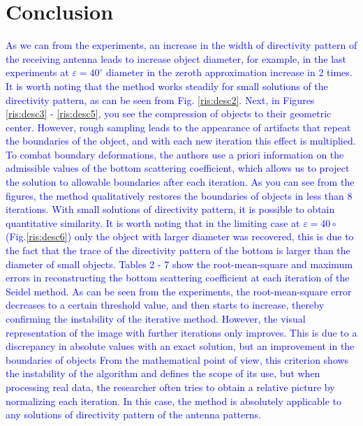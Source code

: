 \documentclass{procDDs}
\begin{document}
\section*{Conclusion}
\textcolor{blue}{
As we can from the experiments, an increase in the width of directivity pattern of the receiving antenna leads to increase object diameter, for example, in the last experiments at $\varepsilon=40^\circ$ diameter in the zeroth approximation increase in 2 times. It is worth noting that the method works steadily for small solutions of the directivity pattern, as can be seen from Fig. \ref{ris:desc2}. Next, in Figures \ref{ris:desc3} - \ref{ris:desc5}, you see the compression of objects to their geometric center. However, rough sampling leads to the appearance of artifacts that repeat the boundaries of the object, and with each new iteration this effect is multiplied. To combat boundary deformations, the authors use a priori information on the admissible values of the bottom scattering coefficient, which allows us to project the solution to allowable boundaries after each iteration. As you can see from the figures, the method qualitatively restores the boundaries of objects in less than 8 iterations. With small solutions of directivity pattern, it is possible to obtain quantitative similarity. It is worth noting that in the limiting case at $\varepsilon = 40\circ$ (Fig.\ref{ris:desc6}) only the object with larger diameter was recovered, this is due to the fact that the trace of the directivity pattern of the bottom is larger than the diameter of small objects. Tables 2 - 7 show the root-mean-square and maximum errors in reconstructing the bottom scattering coefficient at each iteration of the Seidel method. As can be seen from the experiments, the root-mean-square error decreases to a certain threshold value, and then starts to increase, thereby confirming the instability of the iterative method. However, the visual representation of the image with further iterations only improves. This is due to a discrepancy in absolute values with an exact solution, but an improvement in the boundaries of objects From the mathematical point of view, this criterion shows the instability of the algorithm and defines the scope of its use, but when processing real data, the researcher often tries to obtain a relative picture by normalizing each iteration. In this case, the method is absolutely applicable to any solutions of directivity pattern of the antenna patterns.
}
\end{document}
